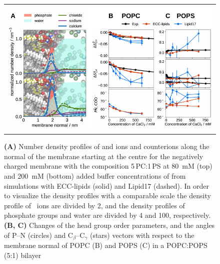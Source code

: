 \documentclass[journal=jpcbfk,manuscript=article]{achemso}
\newlength{\figwidth}
\newlength{\figwidthfull}
\begin{document}
\begin{figure}[tbp!] 
  \centering 
  \begin{tabular}{ c }
  \includegraphics[width=\figwidthfull]{../img/deltaOP_cacl_PC-PS.pdf} 
  \end{tabular}
  \caption{
    \label{fig:cacl-dens_PCPS} 
    \label{fig:delta_ordPar_CaCl_PCPS} 
    \textbf{(A)}
    Number density profiles of  and  ions and  counterions 
    along the normal of the membrane starting at the centre
    for the negatively charged membrane with the composition 5\,PC:1\,PS
    at 80~mM (top) and 200~mM (bottom) added buffer concentrations of  from simulations with ECC-lipids (solid) and Lipid17 (dashed). 
    In order to visualize the density profiles with a comparable scale 
    the density profile of~ ions are divided by 2, and 
    the density profiles of phosphate groups and water are divided by 4 and 100, respectively.  
    \textbf{(B, C)}
    Changes of the head group order parameters, and the angles of P--N (circles) and C$_\beta$--C$_\gamma$ (stars) vectors 
    with respect to the membrane normal of POPC (B) and POPS (C) in a POPC:POPS (5:1) bilayer 
}
\end{figure}
\end{document}
